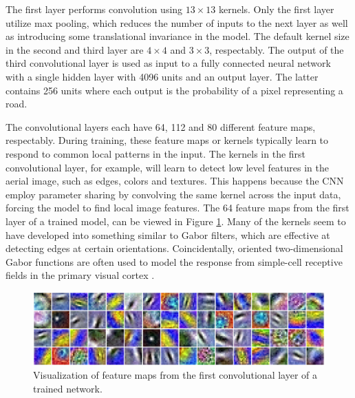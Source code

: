 The first layer performs convolution using $13 \times 13$ kernels. Only the first layer utilize max pooling, which reduces the number of inputs to the next layer as well as introducing some translational invariance in the model. The default kernel size in the second and third layer are $4 \times 4$ and $3 \times 3$, respectably. The output of the third convolutional layer is used as input to a fully connected neural network with a single hidden layer with 4096 units and an output layer. The latter contains 256 units where each output is the probability of a pixel representing a road.\\


The convolutional layers each have 64, 112 and 80 different feature maps, respectably. During training, these feature maps or kernels typically learn to respond to common local patterns in the input. The kernels in the first convolutional layer, for example, will learn to detect low level features in the aerial image, such as edges, colors and textures. This happens because the \ac{CNN} employ parameter sharing by convolving the same kernel across the input data, forcing the model to find local image features. The 64 feature maps from the first layer of a trained model, can be viewed in Figure \ref{fig:convoluional_first_layer_visualization}. Many of the kernels seem to have developed into something similar to Gabor filters, which are effective at detecting edges at certain orientations. Coincidentally, oriented two-dimensional Gabor functions are often used to model the response from simple-cell receptive fields in the primary visual cortex \citep{Ringach_gabor_spatial}. \\


\begin{figure}
\begin{center}
\includegraphics[width=1\columnwidth]{figs/network/Filter_unblurred.png}
\caption[Visualization of filter map]{Visualization of feature maps from the first convolutional layer of a trained network.}
\label{fig:convoluional_first_layer_visualization}
\end{center}
\end{figure}


